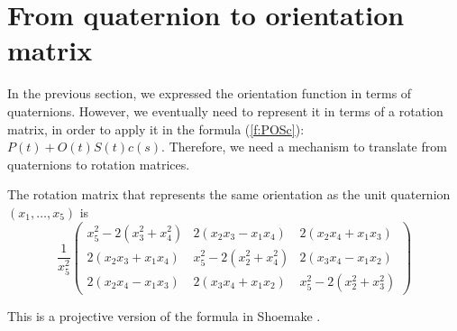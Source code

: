 \section{From quaternion to orientation matrix}
\label{sec:q2rot}

In the previous section, we expressed the orientation function in terms
of quaternions.
However, we eventually need to represent it in terms of a rotation matrix,
in order to apply it in the formula (\ref{f:POSc}): $P(t) + O(t)S(t)c(s)$.
Therefore, we need a mechanism to translate from quaternions to
rotation matrices.

\begin{lemma}
\label{lem:qtorot}
The rotation matrix that represents the same orientation as the 
unit quaternion $(x_1,\ldots,x_5)$ is
\begin{equation}
	\frac{1}{x_5^2}
	\left( \begin{array}{ccc}
	x_5^2 - 2(x_3^2 + x_4^2)& 2(x_2x_3 - x_1x_4)	& 2(x_2x_4 + x_1x_3) \\
	2(x_2x_3 + x_1x_4)	& x_5^2-2(x_2^2 + x_4^2)& 2(x_3x_4 - x_1x_2) \\
	2(x_2x_4 - x_1x_3)	& 2(x_3x_4 + x_1x_2)	& x_5^2-2(x_2^2 + x_3^2)
	\end{array} \right)
\end{equation}
\end{lemma}
\prf
This is a projective version of the formula in Shoemake \cite{shoemake85}.
\QED


